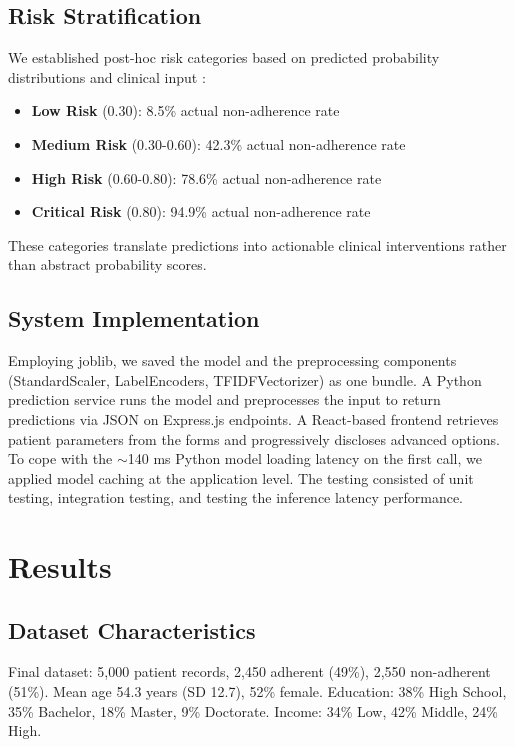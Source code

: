 \documentclass{article}
\begin{document}
\subsection{Risk Stratification}\label{subsec:risk}

We established post-hoc risk categories based on predicted probability distributions and clinical input :
\begin{itemize}
\item \textbf{Low Risk} (0.30): 8.5\% actual non-adherence rate
\item \textbf{Medium Risk} (0.30-0.60): 42.3\% actual non-adherence rate
\item \textbf{High Risk} (0.60-0.80): 78.6\% actual non-adherence rate
\item \textbf{Critical Risk} (0.80): 94.9\% actual non-adherence rate
\end{itemize}

These categories translate predictions into actionable clinical interventions rather than abstract probability scores.

\subsection{System Implementation}\label{subsec:implementation}

Employing joblib, we saved the model and the preprocessing components (StandardScaler, LabelEncoders, TFIDFVectorizer) as one bundle. A Python prediction service runs the model and preprocesses the input to return predictions via JSON on Express.js endpoints. A React-based frontend retrieves patient parameters from the forms and progressively discloses advanced options. To cope with the $\sim$140 ms Python model loading latency on the first call, we applied model caching at the application level. The testing consisted of unit testing, integration testing, and testing the inference latency performance.

\section{Results}\label{sec:results}

\subsection{Dataset Characteristics}\label{subsec:dataset-char}

Final dataset: 5,000 patient records, 2,450 adherent (49\%), 2,550 non-adherent (51\%). Mean age 54.3 years (SD 12.7), 52\% female. Education: 38\% High School, 35\% Bachelor, 18\% Master, 9\% Doctorate. Income: 34\% Low, 42\% Middle, 24\% High.
\end{document}
